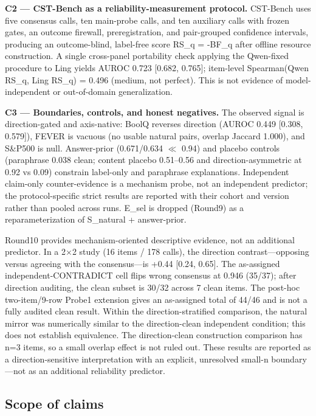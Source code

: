 \documentclass[11pt]{article}
\begin{document}
\textbf{C2 --- CST-Bench as a reliability-measurement protocol.} CST-Bench uses five consensus calls, ten main-probe calls, and ten auxiliary calls with frozen gates, an outcome firewall, preregistration, and pair-grouped confidence intervals, producing an outcome-blind, label-free score RS\_\allowbreak{}q = -BF\_\allowbreak{}q after offline resource construction. A single cross-panel portability check applying the Qwen-fixed procedure to Ling yields AUROC 0.723 [0.682, 0.765]; item-level Spearman(Qwen RS\_\allowbreak{}q, Ling RS\_\allowbreak{}q) = 0.496 (medium, not perfect). This is not evidence of model-independent or out-of-domain generalization.

\textbf{C3 --- Boundaries, controls, and honest negatives.} The observed signal is direction-gated and axis-native: BoolQ reverses direction (AUROC 0.449 [0.308, 0.579]), FEVER is vacuous (no usable natural pairs, overlap Jaccard 1.000), and S\&P500 is null. Answer-prior (0.671/0.634 $\ll$ 0.94) and placebo controls (paraphrase 0.038 clean; content placebo 0.51--0.56 and direction-asymmetric at 0.92 vs 0.09) constrain label-only and paraphrase explanations. Independent claim-only counter-evidence is a mechanism probe, not an independent predictor; the protocol-specific strict results are reported with their cohort and version rather than pooled across runs. E\_\allowbreak{}sel is dropped (Round9) as a reparameterization of S\_\allowbreak{}natural + answer-prior.

Round10 provides mechanism-oriented descriptive evidence, not an additional predictor. In a 2$\times$2 study (16 items / 178 calls), the direction contrast---opposing versus agreeing with the consensus---is +0.44 [0.24, 0.65]. The as-assigned independent-CONTRADICT cell flips wrong consensus at 0.946 (35/37); after direction auditing, the clean subset is 30/32 across 7 clean items. The post-hoc two-item/9-row Probe1 extension gives an as-assigned total of 44/46 and is not a fully audited clean result. Within the direction-stratified comparison, the natural mirror was numerically similar to the direction-clean independent condition; this does not establish equivalence. The direction-clean construction comparison has n=3 items, so a small overlap effect is not ruled out. These results are reported as a direction-sensitive interpretation with an explicit, unresolved small-n boundary---not as an additional reliability predictor.

\subsection{Scope of claims}
\end{document}
